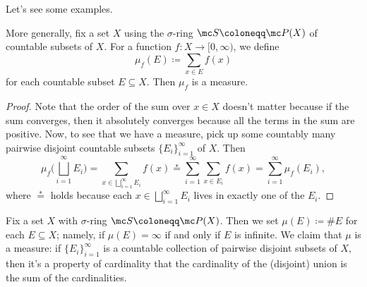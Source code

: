 \documentclass[../notes.tex]{subfiles}
\begin{document}
Let's see some examples.
\begin{exe} \label{exe:discrete-integral}
	More generally, fix a set $X$ using the $\sigma$-ring $\mc S\coloneqq\mc P(X)$ of countable subsets of $X$. For a function $f\colon X\to[0,\infty)$, we define
	\[\mu_f(E)\coloneqq\sum_{x\in E}f(x)\]
	for each countable subset $E\subseteq X$. Then $\mu_f$ is a measure.
\end{exe}
\begin{proof}
	Note that the order of the sum over $x\in X$ doesn't matter because if the sum converges, then it absolutely converges because all the terms in the sum are positive. Now, to see that we have a measure, pick up some countably many pairwise disjoint countable subsets $\{E_i\}_{i=1}^\infty$ of $X$. Then
	\[\mu_f\Bigg(\bigsqcup_{i=1}^\infty E_i\Bigg)=\sum_{x\in\bigsqcup_{i=1}^\infty E_i}f(x)\stackrel*=\sum_{i=1}^\infty\sum_{x\in E_i}f(x)=\sum_{i=1}^\infty\mu_f(E_i),\]
	where $\stackrel*=$ holds because each $x\in\bigsqcup_{i=1}^\infty E_i$ lives in exactly one of the $E_i$.
\end{proof}
\begin{ex}
	Fix a set $X$ with $\sigma$-ring $\mc S\coloneqq\mc P(X)$. Then we set $\mu(E)\coloneqq\#E$ for each $E\subseteq X$; namely, if $\mu(E)=\infty$ if and only if $E$ is infinite. We claim that $\mu$ is a measure: if $\{E_i\}_{i=1}^\infty$ is a countable collection of pairwise disjoint subsets of $X$, then it's a property of cardinality that the cardinality of the (disjoint) union is the sum of the cardinalities.
\end{ex}
\end{document}
